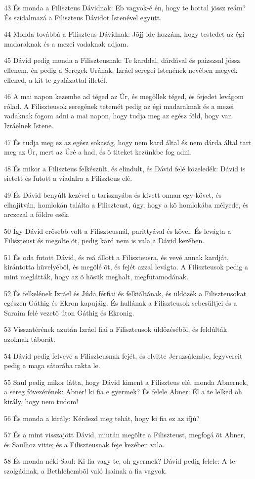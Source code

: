 \par 43 És monda a Filiszteus Dávidnak: Eb vagyok-é én, hogy te bottal jössz reám? És szidalmazá a Filiszteus Dávidot Istenével együtt.
\par 44 Monda továbbá a Filiszteus Dávidnak: Jõjj ide hozzám, hogy testedet az égi madaraknak és a mezei vadaknak adjam.
\par 45 Dávid pedig monda a Filiszteusnak: Te karddal, dárdával és paizszsal jössz ellenem, én pedig a Seregek Urának, Izráel seregei Istenének nevében megyek ellened, a kit te gyalázattal illetél.
\par 46 A mai napon kezembe ad téged az Úr, és megöllek téged, és fejedet levágom rólad. A Filiszteusok seregének tetemét pedig az égi madaraknak és a mezei vadaknak fogom adni a mai napon, hogy tudja meg az egész föld, hogy van Izráelnek Istene.
\par 47 És tudja meg ez az egész sokaság, hogy nem kard által és nem dárda által tart meg az Úr, mert az Úré a had, és õ titeket kezünkbe fog adni.
\par 48 És mikor a Filiszteus felkészült, és elindult, és Dávid felé közeledék: Dávid is sietett és futott a viadalra a Filiszteus elé.
\par 49 És Dávid benyúlt kezével a tarisznyába és kivett onnan egy követ, és elhajítván, homlokán találta a Filiszteust, úgy, hogy a kõ homlokába mélyede, és arczczal a földre esék.
\par 50 Így Dávid erõsebb volt a Filiszteusnál, parittyával és kõvel. És levágta a Filiszteust és megölte õt, pedig kard nem is vala a Dávid kezében.
\par 51 És oda futott Dávid, és reá állott a Filiszteusra, és vevé annak kardját, kirántotta hüvelyébõl, és megölé õt, és fejét azzal levágta. A Filiszteusok pedig a mint meglátták, hogy az õ hõsük meghalt, megfutamodának.
\par 52 És felkelének Izráel és Júda férfiai és felkiáltának, és üldözék a Filiszteusokat egészen Gáthig és Ekron kapujáig. És hullának a Filiszteusok sebesültjei és a Saraim felé vezetõ úton Gáthig és Ekronig.
\par 53 Visszatérének azután Izráel fiai a Filiszteusok üldözésébõl, és feldúlták azoknak táborát.
\par 54 Dávid pedig felvevé a Filiszteusnak fejét, és elvitte Jeruzsálembe, fegyvereit pedig a maga sátorába rakta le.
\par 55 Saul pedig mikor látta, hogy Dávid kiment a Filiszteus elé, monda Abnernek, a sereg fõvezérének: Abner! ki fia e gyermek? És felele Abner: Él a te lelked oh király, hogy nem tudom!
\par 56 És monda a király: Kérdezd meg tehát, hogy ki fia ez az ifjú?
\par 57 És a mint visszajött Dávid, miután megölte a Filiszteust, megfogá õt Abner, és Saulhoz vitte; és a Filiszteusnak feje kezében vala.
\par 58 És monda néki Saul: Ki fia vagy te, oh gyermek? Dávid pedig felele: A te szolgádnak, a Bethlehembõl való Isainak a fia vagyok.

